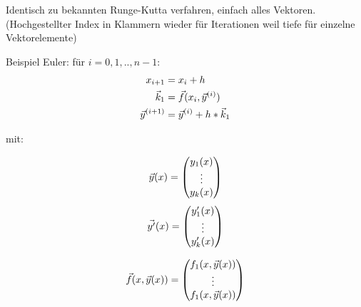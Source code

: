Identisch zu bekannten Runge-Kutta verfahren, einfach alles Vektoren.
(Hochgestellter Index in Klammern wieder für Iterationen weil tiefe für
einzelne Vektorelemente)


Beispiel Euler: für $i = 0,1,..,n-1$:
\begin{align*}
	x_{i+1}          & = x_i + h                     \\
	\vec k_1           & = \vec f(x_i, \vec y^{(i)})   \\
	\vec y^{(i+1)} & = \vec y^{(i)} + h * \vec k_1
\end{align*}


mit:
\begin{multicols}{2}
	$$\vec y(x) = \begin{pmatrix} y_1(x) \\ \vdots \\ y_k(x) \end{pmatrix}$$
	$$\vec{y'}(x) = \begin{pmatrix} y'_1(x) \\ \vdots \\ y'_k(x) \end{pmatrix}$$

	\columnbreak

	$$\vec f(x, \vec y(x)) = \begin{pmatrix} f_1(x, \vec y(x)) \\ \vdots \\ f_1(x, \vec y(x)) \end{pmatrix}$$
\end{multicols}

